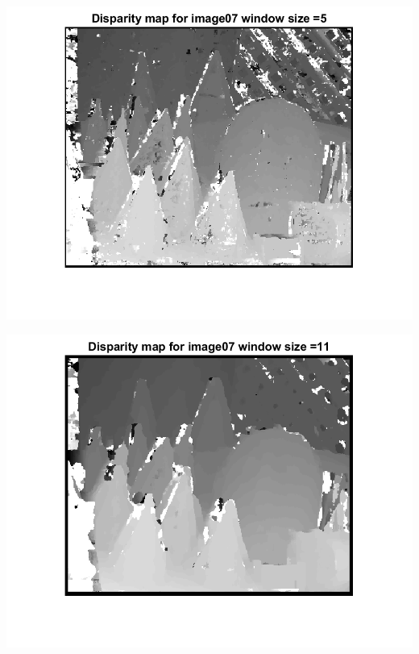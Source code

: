 \documentclass[a4paper]{iacas}
\begin{document}
\begin{minipage}{\linewidth}
	\includegraphics[scale=1]{results/04_16_06/disp_map_07_template_1.png}
	\label{fig_4}
\end{minipage}
\vskip 0.1in
\begin{minipage}{\linewidth}
	\includegraphics[scale=1]{results/04_16_06/disp_map_07_template_2.png}
	\label{fig_4}
\end{minipage}
\vskip 0.1in
\end{document}
